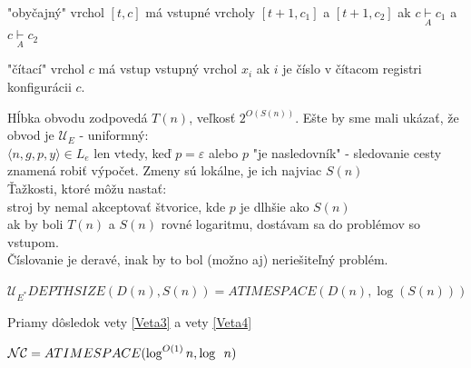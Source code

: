 \begin{dokaz}
  \begin{description}
  \item "obyčajný" vrchol $[t,c]$ má vstupné vrcholy $[t+1,c_1]$ a $[t+1,c_2]$ ak $c
  \underset{A}{\vdash}c_1$ a $c \underset{A}{\vdash}c_2$
  \item "čítací" vrchol $c$ má vstup vstupný vrchol $x_i$ ak $i$ je číslo v čítacom
  registri konfigurácii $c$.
  \end{description}
  Hĺbka obvodu zodpovedá $T(n)$, veľkosť $2^{O(S(n))}$. Ešte by sme mali ukázať, že obvod
  je $\mathcal{U}_E$ - uniformný:\\ $\langle n,g,p,y \rangle \in L_e$ len vtedy, keď
  $p=\varepsilon$ alebo $p$ "je nasledovník" - sledovanie cesty znamená robiť výpočet.
  Zmeny sú lokálne, je ich najviac $S(n)$\\ Ťažkosti, ktoré môžu nastať:\\ stroj by nemal
  akceptovať štvorice, kde $p$ je dlhšie ako $S(n)$ \\ ak by boli $T(n)$ a $S(n)$ rovné
  logaritmu, dostávam sa do problémov so vstupom.\\ Číslovanie je deravé, inak by to bol
  (možno aj) neriešiteľný problém.
\end{dokaz}

\begin{veta}
  $\mathcal{U}_{E^*}DEPTHSIZE(D(n),S(n))=ATIMESPACE(D(n),\log(S(n)))$
\end{veta}

\begin{dokaz}
  Priamy dôsledok vety \ref{Veta3} a vety \ref{Veta4}
\end{dokaz}

\begin{dosledok}
  $\mathcal{NC}=ATIMESPACE(\log^{O(1)}n,\log \enspace n)$
\end{dosledok}
